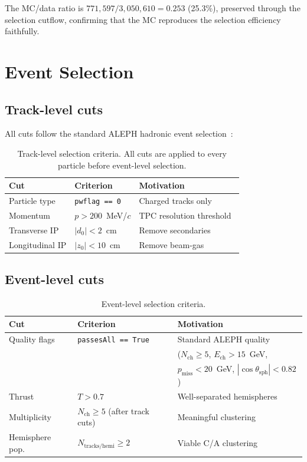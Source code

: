 \documentclass[11pt,a4paper]{article}
\begin{document}
The MC/data ratio is $771{,}597 / 3{,}050{,}610 = 0.253$ (25.3\%),
preserved through the selection cutflow, confirming that the MC
reproduces the selection efficiency faithfully.

\section{Event Selection}
\label{sec:selection}

\subsection{Track-level cuts}
\label{sec:track-cuts}

All cuts follow the standard ALEPH hadronic event
selection~\cite{ALEPH:1998vtv,ALEPH:1998hhr,ALEPH:1999rgl}:

\begin{table}[htbp]
\centering
\caption{Track-level selection criteria.  All cuts are applied to
  every particle before event-level selection.}
\label{tbl:track-cuts}
\begin{tabular}{lll}
\toprule
Cut & Criterion & Motivation \\
\midrule
Particle type & \texttt{pwflag == 0} & Charged tracks only \\
Momentum & $p > 200$~MeV/$c$ & TPC resolution threshold~\cite{ALEPH:1998hhr} \\
Transverse IP & $|d_0| < 2$~cm & Remove secondaries~\cite{ALEPH:1998vtv} \\
Longitudinal IP & $|z_0| < 10$~cm & Remove beam-gas~\cite{ALEPH:1998vtv} \\
\bottomrule
\end{tabular}
\end{table}

\subsection{Event-level cuts}
\label{sec:event-cuts}

\begin{table}[htbp]
\centering
\caption{Event-level selection criteria.}
\label{tbl:event-cuts}
\begin{tabular}{lll}
\toprule
Cut & Criterion & Motivation \\
\midrule
Quality flags & \texttt{passesAll == True} &
  Standard ALEPH quality \\
 & & ($N_\text{ch} \ge 5$, $E_\text{ch} > 15$~GeV, \\
 & & $p_\text{miss} < 20$~GeV, $|\cos\theta_\text{sph}| < 0.82$) \\
Thrust & $T > 0.7$ & Well-separated hemispheres \\
Multiplicity & $N_\text{ch} \ge 5$ (after track cuts) & Meaningful clustering \\
Hemisphere pop. & $N_\text{tracks/hemi} \ge 2$ & Viable C/A clustering \\
\bottomrule
\end{tabular}
\end{table}
\end{document}
